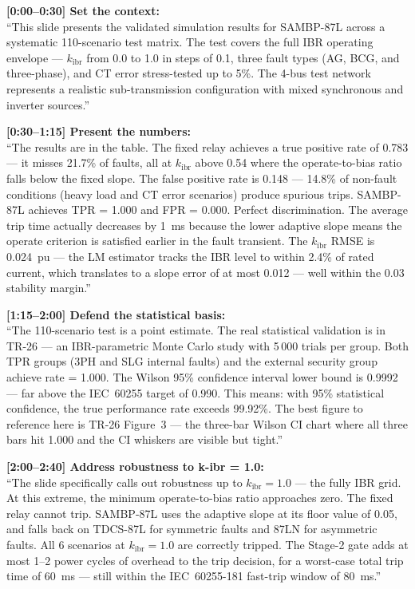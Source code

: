 \documentclass[12pt,a4paper]{article}
\begin{document}
\begin{speakbox}
\textbf{[0:00--0:30] Set the context:}\\
``This slide presents the validated simulation results for SAMBP-87L across a systematic 110-scenario test matrix. The test covers the full IBR operating envelope --- $k_\mathrm{ibr}$ from 0.0 to 1.0 in steps of 0.1, three fault types (AG, BCG, and three-phase), and CT error stress-tested up to 5\%. The 4-bus test network represents a realistic sub-transmission configuration with mixed synchronous and inverter sources.''

\textbf{[0:30--1:15] Present the numbers:}\\
``The results are in the table. The fixed relay achieves a true positive rate of 0.783 --- it misses 21.7\% of faults, all at $k_\mathrm{ibr}$ above 0.54 where the operate-to-bias ratio falls below the fixed slope. The false positive rate is 0.148 --- 14.8\% of non-fault conditions (heavy load and CT error scenarios) produce spurious trips. SAMBP-87L achieves TPR = 1.000 and FPR = 0.000. Perfect discrimination. The average trip time actually decreases by 1~ms because the lower adaptive slope means the operate criterion is satisfied earlier in the fault transient. The $k_\mathrm{ibr}$ RMSE is 0.024~pu --- the LM estimator tracks the IBR level to within 2.4\% of rated current, which translates to a slope error of at most 0.012 --- well within the 0.03 stability margin.''

\textbf{[1:15--2:00] Defend the statistical basis:}\\
``The 110-scenario test is a point estimate. The real statistical validation is in TR-26 --- an IBR-parametric Monte Carlo study with 5\,000 trials per group. Both TPR groups (3PH and SLG internal faults) and the external security group achieve rate = 1.000. The Wilson 95\% confidence interval lower bound is 0.9992 --- far above the IEC~60255 target of 0.990. This means: with 95\% statistical confidence, the true performance rate exceeds 99.92\%. The best figure to reference here is TR-26 Figure~3 --- the three-bar Wilson CI chart where all three bars hit 1.000 and the CI whiskers are visible but tight.''

\textbf{[2:00--2:40] Address robustness to k-ibr = 1.0:}\\
``The slide specifically calls out robustness up to $k_\mathrm{ibr} = 1.0$ --- the fully IBR grid. At this extreme, the minimum operate-to-bias ratio approaches zero. The fixed relay cannot trip. SAMBP-87L uses the adaptive slope at its floor value of 0.05, and falls back on TDCS-87L for symmetric faults and 87LN for asymmetric faults. All 6 scenarios at $k_\mathrm{ibr} = 1.0$ are correctly tripped. The Stage-2 gate adds at most 1--2 power cycles of overhead to the trip decision, for a worst-case total trip time of 60~ms --- still within the IEC~60255-181 fast-trip window of 80~ms.''


\end{speakbox}
\end{document}
